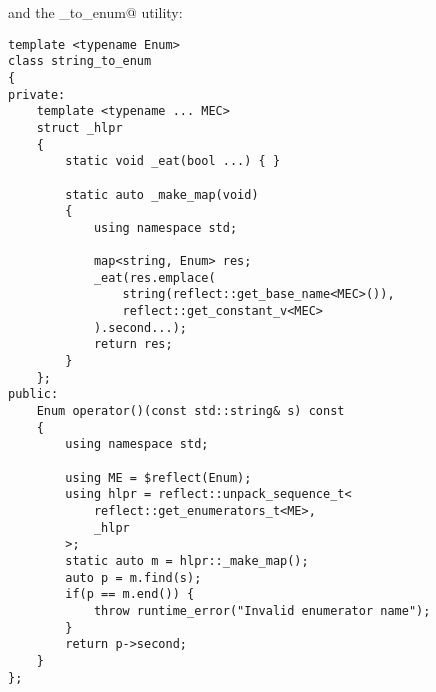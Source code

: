 and the \verb@string_to_enum@ utility:

\begin{verbatim}
template <typename Enum>
class string_to_enum
{
private:
	template <typename ... MEC>
	struct _hlpr
	{
		static void _eat(bool ...) { }

		static auto _make_map(void)
		{
			using namespace std;

			map<string, Enum> res;
			_eat(res.emplace(
				string(reflect::get_base_name<MEC>()),
				reflect::get_constant_v<MEC>
			).second...);
			return res;
		}
	};
public:
	Enum operator()(const std::string& s) const
	{
		using namespace std;

		using ME = $reflect(Enum);
		using hlpr = reflect::unpack_sequence_t<
			reflect::get_enumerators_t<ME>,
			_hlpr
		>;
		static auto m = hlpr::_make_map();
		auto p = m.find(s);
		if(p == m.end()) {
			throw runtime_error("Invalid enumerator name");
		}
		return p->second;
	}
};
\end{verbatim}

